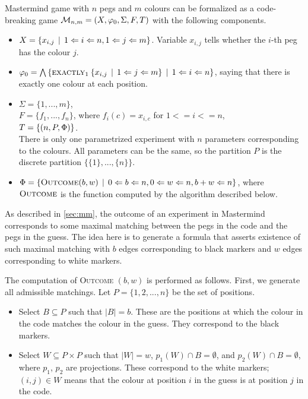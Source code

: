 \begin{example}[Mastermind] \label{ex:form-mastermind}
Mastermind game with $n$ pegs and $m$ colours can be formalized as
a code-breaking game
$\mathcal{M}_{n,m} = (X, \varphi_0, \Sigma, F, T)$
  with the following components.

\begin{itemize}
\item
$X = \{x_{i,j} \:\:|\:\: 1<=i<=n, 1<=j<=m \}$.
  Variable $x_{i,j}$ tells whether the $i$-th peg has the colour $j$.
\item
$\varphi_0 = \bigwedge\left\{
  \textsc{exactly}_{1}\: \{x_{i,j} \:\:|\:\: 1<=j<=m\} \:\:|\:\: 1<=i<=n\right\}$, saying that
  there is exactly one colour at each position.
\item $\Sigma = \{1,...,m\}$, \\
 $F = \{ f_1, ..., f_n \}$, where $f_i(c) = x_{i,c}$ for $1<=i<=n$, \\
 $T = \{ (n, P, \Phi) \}$.\\
There is only one parametrized experiment with $n$ parameters corresponding
  to the colours.
All parameters can be the same,
  so the partition $P$ is the discrete partition $\{\{1\},...,\{n\}\}$.
\item $\Phi = \{ \textsc{Outcome}(b, w) \:\:|\:\: 0<=b<=n, 0<=w<=n, b+w<=n \}$,
where $\textsc{Outcome}$ is the function computed by the algorithm described below.
\end{itemize}

As described in \autoref{sec:mm},
  the outcome of an experiment in Mastermind corresponds
  to some maximal matching between
  the pegs in the code and the pegs in the guess.
The idea here is to generate a formula that asserts
  existence of such maximal matching
  with $b$ edges corresponding to black markers and
  $w$ edges corresponding to white markers.

The computation of \textsc{Outcome} $(b, w)$ is performed as follows.
First, we generate all admissible matchings.
Let $P = \{1,2,...,n\}$ be the set of positions.
\begin{itemize}
\item Select $B\subseteq P$ such that $|B| = b$.
  These are the positions at which the colour
  in the code matches the colour in the guess.
  They correspond to the black markers.
\item Select $W\subseteq P\times P$ such that $|W| = w$,
  $p_1(W)\cap B = \emptyset$, and $p_2(W)\cap B = \emptyset$,
  where $p_1$, $p_2$ are projections.
  These correspond to the white markers; $(i, j) \in W$ means that the colour
  at position $i$ in the guess is at position $j$ in the code.
\end{itemize}


\end{example}

